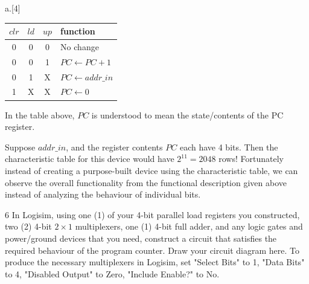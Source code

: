 \begin{question}{a.}[4]
\begin{tabular}{c c c | l}
$clr$ & $ld$ & $up$ & function \\
\hline
0 & 0 & 0 & No change \\
0 & 0 & 1 & $PC \leftarrow PC + 1$ \\
0 & 1 & X & $PC \leftarrow addr\_in$ \\
1 & X & X & $PC \leftarrow 0$ \\
\end{tabular}

In the table above, $PC$ is understood to mean the state/contents of the PC register.

Suppose $addr\_in$, and the register contents $PC$ each have 4 bits. Then the characteristic table for this device would have $2^{11}=2048$ rows! Fortunately instead of creating a purpose-built device using the characteristic table, we can observe the overall functionality from the functional description given above instead of analyzing the behaviour of individual bits.

\item[6] In Logisim, using one (1) of your 4-bit parallel load registers you constructed, two (2) 4-bit $2 \times 1$ multiplexers, one (1) 4-bit full adder, and any logic gates and power/ground devices that you need, construct a circuit that satisfies the required behaviour of the program counter. Draw your circuit diagram here. To produce the necessary multiplexers in Logisim, set "Select Bits" to 1, "Data Bits" to 4, "Disabled Output" to Zero, "Include Enable?" to No.



\end{question}
